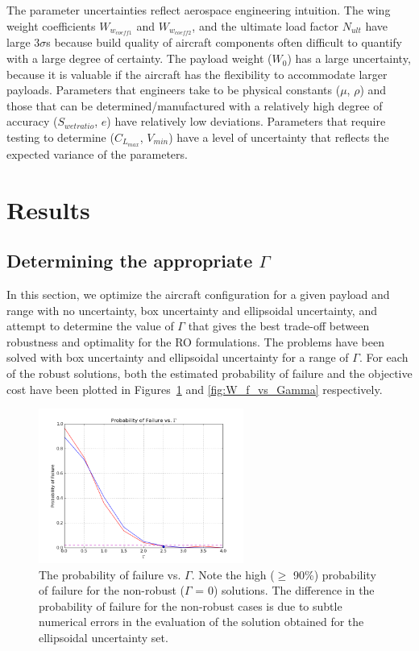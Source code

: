 \documentclass{article}
\begin{document}
{The parameter uncertainties reflect aerospace engineering intuition. The wing weight coefficients $W_{w_{coeff1}}$ and $W_{w_{coeff2}}$, and the ultimate load factor $N_{ult}$ have large $3\sigma$s because build quality of aircraft components often difficult to quantify with a large degree of certainty. The payload weight ($W_0$) has a large uncertainty, because it is valuable if the aircraft has the flexibility to accommodate larger payloads. Parameters that engineers take to be physical constants ($\mu$, $\rho$) and those that can be determined/manufactured with a relatively high degree of accuracy ($S_{wetratio}$, $e$) have relatively low deviations. Parameters that require testing to determine ($C_{L_{max}}$, $V_{min}$) have a level of uncertainty that reflects the expected variance of the parameters. 

\section{Results}

\subsection{Determining the appropriate $\Gamma$}

In this section, we optimize the aircraft configuration for a given payload and range with no uncertainty, box uncertainty and ellipsoidal uncertainty, and attempt to determine the value of $\Gamma$ that gives the best trade-off between robustness and optimality for the RO formulations. The problems have been solved with box uncertainty and ellipsoidal uncertainty for a range of $\Gamma$. For each of the robust solutions, both the estimated probability of failure and the objective cost have been plotted in Figures~\ref{fig:probOfFail_vs_Gamma} and \ref{fig:W_f_vs_Gamma} respectively. 

\begin{figure}[h]
    \centering
    \includegraphics[width=0.6\textwidth]{probOfFail_vs_Gamma.png}
    \caption{The probability of failure vs. $\Gamma$. Note the high ($\geq$ 90\%) probability of failure for the non-robust ($\Gamma$ = 0) solutions. The difference in the probability of failure for the non-robust cases is due to subtle numerical errors in the evaluation of the solution obtained for the ellipsoidal uncertainty set.}
    \label{fig:probOfFail_vs_Gamma}
\end{figure}

}
\end{document}
